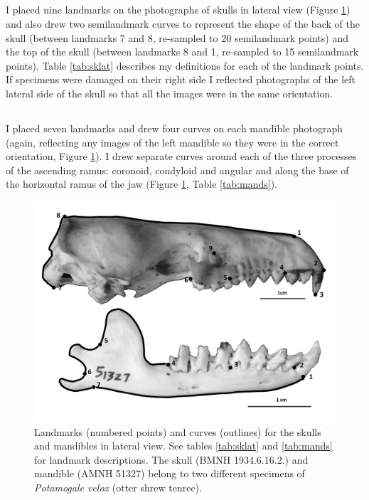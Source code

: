 \subsection{}
	I placed nine landmarks on the photographs of skulls in lateral view (Figure \ref{fig:sklat_mands}) and also drew two semilandmark curves to represent the shape of the back of the skull (between landmarks 7 and 8, re-sampled to 20 semilandmark points) and the top of the skull (between landmarks 8 and 1, re-sampled to 15 semilandmark points). Table \ref{tab:sklat} describes my definitions for each of the landmark points.
	If specimens were damaged on their right side I reflected photographs of the left lateral side of the skull so that all the images were in the same orientation.


\subsection{}
	I placed seven landmarks and drew four curves on each mandible photograph (again, reflecting any images of the left mandible so they were in the correct orientation, Figure \ref{fig:sklat_mands}). I drew separate curves around each of the three processes of the ascending ramus: coronoid, condyloid and angular and along the base of the horizontal ramus of the jaw (Figure \ref{fig:sklat_mands}, Table \ref{tab:mands}). 	

\begin{figure}[!htbp]
	\centering
	\includegraphics[width=1\linewidth]{Methods/figures/Sklat+mands_combined_BW.png}
	\caption[Lateral skulls and mandibles landmarks]
	{Landmarks (numbered points) and curves (outlines) for the skulls and mandibles in lateral view. See tables \ref{tab:sklat} and \ref{tab:mands} for landmark descriptions. The skull (BMNH 1934.6.16.2.) and mandible (AMNH 51327) belong to two different specimens of \textit{Potamogale velox} (otter shrew tenrec).}
	\label{fig:sklat_mands}
\end{figure}

